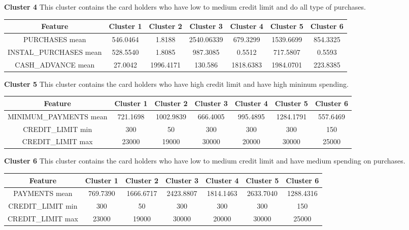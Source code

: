 \documentclass{article}
\begin{document}
            \hfill

            \textbf{Cluster 4}
            This cluster contains the card holders who have low to medium credit limit and do all type of purchases.

            \begin{tabular}{|c|c|c|c|c|c|c|}
                \hline
                Feature & Cluster 1 & Cluster 2 & Cluster 3 & Cluster 4 & Cluster 5 & Cluster 6 \\
                \hline
                PURCHASES mean& 546.0464 &	1.8188 &	2540.06339 & 679.3299 &	1539.6699 &	854.3325 \\
                \hline
                INSTAL\_PURCHASES mean & 528.5540 &	1.8085 &	987.3085 &	0.5512 &	717.5807 &	0.5593 \\
                \hline
                CASH\_ADVANCE mean & 27.0042 &	1996.4171 &	130.586 & 1818.6383 &	1984.0701 &	223.8385 \\
                \hline
            \end{tabular}

            \hfill 

            \textbf{Cluster 5}
            This cluster contains the card holders who have high credit limit and have high mininum spending.

            \begin{tabular}{|c|c|c|c|c|c|c|}
                \hline
                Feature & Cluster 1 & Cluster 2 & Cluster 3 & Cluster 4 & Cluster 5 & Cluster 6 \\
                \hline
                MINIMUM\_PAYMENTS mean& 721.1698 &	1002.9839 &	666.4005 &	995.4895 &	1284.1791 &	557.6469 \\
                \hline
                CREDIT\_LIMIT min & 300 & 50	& 300 & 300 & 300 & 150 \\
                CREDIT\_LIMIT max & 23000	& 19000	& 30000	& 20000	& 30000	& 25000 \\
                \hline
            \end{tabular}

            \hfill

            \textbf{Cluster 6}
            This cluster contains the card holders who have low to medium credit limit and have medium spending on purchases.

            \begin{tabular}{|c|c|c|c|c|c|c|}
                \hline
                Feature & Cluster 1 & Cluster 2 & Cluster 3 & Cluster 4 & Cluster 5 & Cluster 6 \\
                \hline
                PAYMENTS mean	& 769.7390 &	1666.6717 &	2423.8807 &	1814.1463 &	2633.7040 & 1288.4316 \\
                \hline
                CREDIT\_LIMIT min & 300 & 50	& 300 & 300 & 300 & 150 \\
                CREDIT\_LIMIT max & 23000	& 19000	& 30000	& 20000	& 30000	& 25000 \\
                \hline
            \end{tabular}
    \endgroup
\end{document}
